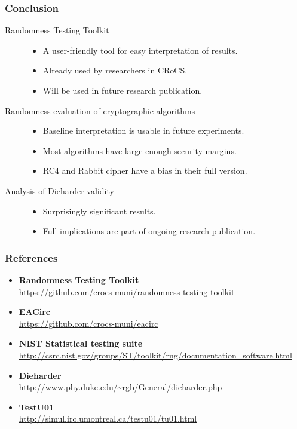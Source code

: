 \documentclass[aspectratio=169]{beamer}
\begin{document}
\begin{frame}
\frametitle{Conclusion}

\begin{description}
\item[Randomness Testing Toolkit] \hfill
\begin{itemize}
\item A user-friendly tool for easy interpretation of results.
\item Already used by researchers in CRoCS.
\item Will be used in future research publication.
\end{itemize}
\vspace{.2cm}
\item[Randomness evaluation of cryptographic algorithms] \hfill
\begin{itemize}
\item Baseline interpretation is usable in future experiments.
\item Most algorithms have large enough security margins.
\item RC4 and Rabbit cipher have a bias in their full version.
\end{itemize}
\vspace{.2cm}
\item[Analysis of Dieharder validity] \hfill
\begin{itemize}
\item Surprisingly significant results.
\item Full implications are part of ongoing research publication.
\end{itemize}
\end{description}

\end{frame}

\begin{frame}
\frametitle{References}

\begin{itemize}
\item \textbf{Randomness Testing Toolkit} \\ \url{https://github.com/crocs-muni/randomness-testing-toolkit}
\item \textbf{EACirc} \\ \url{https://github.com/crocs-muni/eacirc}
\item \textbf{NIST Statistical testing suite} \\ \url{http://csrc.nist.gov/groups/ST/toolkit/rng/documentation_software.html}
\item \textbf{Dieharder} \\ \url{http://www.phy.duke.edu/~rgb/General/dieharder.php}
\item \textbf{TestU01} \\ \url{http://simul.iro.umontreal.ca/testu01/tu01.html}
\end{itemize}

\end{frame}
\end{document}
